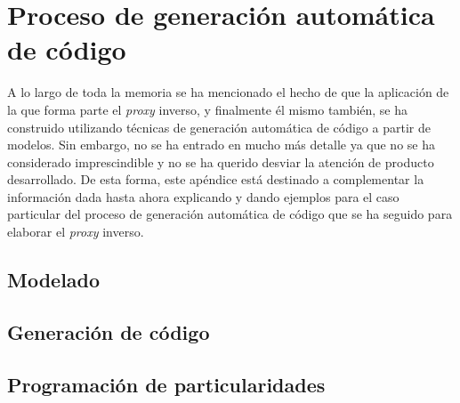 \documentclass[11pt,spanish,listoffigures]{tfgetsinf}
\begin{document}

\APPENDIX

\chapter{Proceso de generación automática de código}

A lo largo de toda la memoria se ha mencionado el hecho de que la aplicación de la que forma parte el \emph{proxy} inverso, y finalmente él mismo también, se ha construido utilizando técnicas de generación automática de código a partir de modelos. Sin embargo, no se ha entrado en mucho más detalle ya que no se ha considerado imprescindible y no se ha querido desviar la atención de producto desarrollado. De esta forma, este apéndice está destinado a complementar la información dada hasta ahora explicando y dando ejemplos para el caso particular del proceso de generación automática de código que se ha seguido para elaborar el \emph{proxy} inverso.

	\section{Modelado}

	\section{Generación de código}

	\section{Programación de particularidades}
\end{document}
